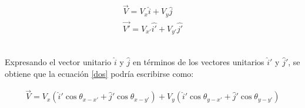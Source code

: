 \documentclass[12pt,letterpaper]{article}
\begin{document}
%
\begin{align}
	\overset{\rightarrow}{V} = V_x \hat{i} + V_y \hat{j} \label{dos}  \\
	\overset{\rightarrow}{V'} = V_{x'} \hat{i'} + V_{y'} \hat{j'} \label{tres}
\end{align}\

Expresando el vector unitario $\hat{i}$ y $\hat{j}$ en términos de los vectores unitarios $\hat{i}'$ y $\hat{j}'$, se obtiene que la ecuación \ref{dos} podría escribirse como: 
%

\begin{align*}
	\overset{\rightarrow}{V} = V_x \left( \hat{i}' \cos \theta_{x-x'} + \hat{j}' \cos \theta_{x-y'} \right) + V_y \left( \hat{i}' \cos \theta_{y-x'} + \hat{j}' \cos \theta_{y-y'} \right)
\end{align*} \
\end{document}
